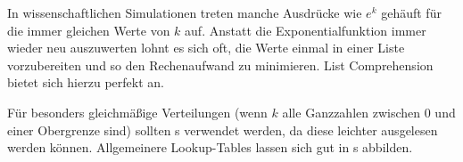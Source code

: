 \begin{hintbox}
In wissenschaftlichen Simulationen treten manche Ausdrücke wie $e^k$ gehäuft für die immer gleichen Werte von $k$ auf. Anstatt die Exponentialfunktion immer wieder neu auszuwerten lohnt es sich oft, die Werte einmal in einer Liste vorzubereiten und so den Rechenaufwand zu minimieren. List Comprehension bietet sich hierzu perfekt an.

Für besonders gleichmäßige Verteilungen (\ie wenn $k$ alle Ganzzahlen zwischen $0$ und einer Obergrenze sind) sollten s verwendet werden, da diese leichter ausgelesen werden können. Allgemeinere Lookup-Tables lassen sich gut in s abbilden.
\end{hintbox}